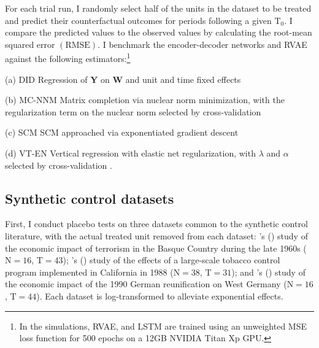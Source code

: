 \documentclass[hidelinks,12pt]{article}
\newcommand{\possessivecite}[1]{\citeauthor{#1}'s (\citeyear{#1})}
\begin{document}
For each trial run, I randomly select half of the units in the dataset to be treated and predict their counterfactual outcomes for periods following a given $\text{T}_0$. I compare the predicted values to the observed values by calculating the root-mean squared error $(\text{RMSE})$. I benchmark the encoder-decoder networks and RVAE against the following estimators:\footnote{In the simulations, RVAE, and LSTM are trained using an unweighted MSE loss function for 500 epochs on a 12GB NVIDIA Titan Xp GPU.}
%
\begin{description}
	\begin{singlespace}
		{\setlength\itemindent{1mm}
			\item[(a) DID] Regression of $\textbf{Y}$ on $\textbf{W}$ and unit and time fixed effects
			\item[(b) MC-NNM] Matrix completion via nuclear norm minimization, with the regularization term on the nuclear norm selected by cross-validation \citep{athey2017matrix}
			\item[(c) SCM] SCM approached via exponentiated gradient descent \citep{abadie2010synthetic}
			\item[(d) VT-EN] Vertical regression with elastic net regularization, with $\lambda$ and $\alpha$ selected by cross-validation \citep{athey2017matrix}.
		}
	\end{singlespace}
\end{description}

\subsection{Synthetic control datasets} \label{synth-placebo}

First, I conduct placebo tests on three datasets common to the synthetic control literature, with the actual treated unit removed from each dataset: \possessivecite{abadie2003economic} study of the economic impact of terrorism in the Basque Country during the late 1960s ($\text{N}=16$, $\text{T}=43$); \possessivecite{abadie2010synthetic} study of the effects of a large-scale tobacco control program implemented in California in 1988 ($\text{N}=38$, $\text{T}=31$); and \possessivecite{abadie2015comparative} study of the economic impact of the 1990 German reunification on West Germany ($\text{N}=16$, $\text{T}=44$). Each dataset is log-transformed to alleviate exponential effects.
\end{document}
